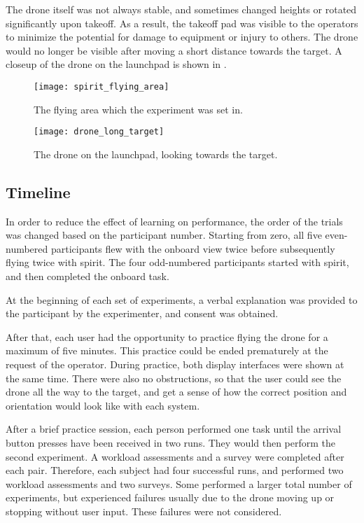 The drone itself was not always stable, and sometimes changed heights or rotated significantly upon takeoff.
As a result, the takeoff pad was visible to the operators to minimize the potential for damage to equipment or injury to others.
The drone would no longer be visible after moving a short distance towards the target.
A closeup of the drone on the launchpad is shown in .

\begin{figure}
\centering
\hfill
\begin{minipage}{0.45\textwidth}
  \centering
  \texttt{[image: spirit\_flying\_area]}
  \caption[Flying area]{The flying area which the experiment was set in.}
  \label{fig:flying_area}
\end{minipage}%
\hfill
\begin{minipage}{.45\textwidth}
  \centering
  \texttt{[image: drone\_long\_target]}
  \caption[Drone on pad]{The drone on the launchpad, looking towards the target.}
  \label{fig:drone_long_target}
\end{minipage}
\hfill
\end{figure}

\subsection{Timeline}
In order to reduce the effect of learning on performance, the order of the trials was changed based on the participant number.
Starting from zero, all five even-numbered participants flew with the onboard view twice before subsequently flying twice with \gls{spirit}.
The four odd-numbered participants started with \gls{spirit}, and then completed the onboard task.

At the beginning of each set of experiments, a verbal explanation was provided to the participant by the experimenter, and consent was obtained.

After that, each user had the opportunity to practice flying the drone for a maximum of five minutes.
This practice could be ended prematurely at the request of the operator.
During practice, both display interfaces were shown at the same time.
There were also no obstructions, so that the user could see the drone all the way to the target, and get a sense of how the correct position and orientation would look like with each system.

After a brief practice session, each person performed one task until the arrival button presses have been received in two runs.
They would then perform the second experiment.
A workload assessments and a survey were completed  after each pair.
Therefore, each subject had four successful runs, and performed two workload assessments and two surveys.
Some performed a larger total number of experiments, but experienced failures usually due to the drone moving up or stopping without user input.
These failures were not considered.

